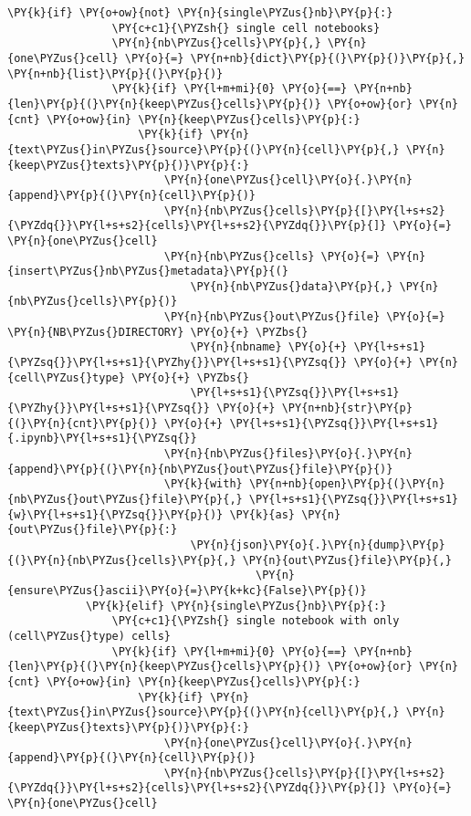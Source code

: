 \begin{tcolorbox}[breakable, size=fbox, boxrule=1pt, pad at break*=1mm,colback=cellbackground, colframe=cellborder]
\begin{Verbatim}[commandchars=\\\{\}]
            \PY{k}{if} \PY{o+ow}{not} \PY{n}{single\PYZus{}nb}\PY{p}{:}
                \PY{c+c1}{\PYZsh{} single cell notebooks}
                \PY{n}{nb\PYZus{}cells}\PY{p}{,} \PY{n}{one\PYZus{}cell} \PY{o}{=} \PY{n+nb}{dict}\PY{p}{(}\PY{p}{)}\PY{p}{,} \PY{n+nb}{list}\PY{p}{(}\PY{p}{)}
                \PY{k}{if} \PY{l+m+mi}{0} \PY{o}{==} \PY{n+nb}{len}\PY{p}{(}\PY{n}{keep\PYZus{}cells}\PY{p}{)} \PY{o+ow}{or} \PY{n}{cnt} \PY{o+ow}{in} \PY{n}{keep\PYZus{}cells}\PY{p}{:}
                    \PY{k}{if} \PY{n}{text\PYZus{}in\PYZus{}source}\PY{p}{(}\PY{n}{cell}\PY{p}{,} \PY{n}{keep\PYZus{}texts}\PY{p}{)}\PY{p}{:}
                        \PY{n}{one\PYZus{}cell}\PY{o}{.}\PY{n}{append}\PY{p}{(}\PY{n}{cell}\PY{p}{)}
                        \PY{n}{nb\PYZus{}cells}\PY{p}{[}\PY{l+s+s2}{\PYZdq{}}\PY{l+s+s2}{cells}\PY{l+s+s2}{\PYZdq{}}\PY{p}{]} \PY{o}{=} \PY{n}{one\PYZus{}cell}
                        \PY{n}{nb\PYZus{}cells} \PY{o}{=} \PY{n}{insert\PYZus{}nb\PYZus{}metadata}\PY{p}{(}
                            \PY{n}{nb\PYZus{}data}\PY{p}{,} \PY{n}{nb\PYZus{}cells}\PY{p}{)}
                        \PY{n}{nb\PYZus{}out\PYZus{}file} \PY{o}{=} \PY{n}{NB\PYZus{}DIRECTORY} \PY{o}{+} \PYZbs{}
                            \PY{n}{nbname} \PY{o}{+} \PY{l+s+s1}{\PYZsq{}}\PY{l+s+s1}{\PYZhy{}}\PY{l+s+s1}{\PYZsq{}} \PY{o}{+} \PY{n}{cell\PYZus{}type} \PY{o}{+} \PYZbs{}
                            \PY{l+s+s1}{\PYZsq{}}\PY{l+s+s1}{\PYZhy{}}\PY{l+s+s1}{\PYZsq{}} \PY{o}{+} \PY{n+nb}{str}\PY{p}{(}\PY{n}{cnt}\PY{p}{)} \PY{o}{+} \PY{l+s+s1}{\PYZsq{}}\PY{l+s+s1}{.ipynb}\PY{l+s+s1}{\PYZsq{}}
                        \PY{n}{nb\PYZus{}files}\PY{o}{.}\PY{n}{append}\PY{p}{(}\PY{n}{nb\PYZus{}out\PYZus{}file}\PY{p}{)}
                        \PY{k}{with} \PY{n+nb}{open}\PY{p}{(}\PY{n}{nb\PYZus{}out\PYZus{}file}\PY{p}{,} \PY{l+s+s1}{\PYZsq{}}\PY{l+s+s1}{w}\PY{l+s+s1}{\PYZsq{}}\PY{p}{)} \PY{k}{as} \PY{n}{out\PYZus{}file}\PY{p}{:}
                            \PY{n}{json}\PY{o}{.}\PY{n}{dump}\PY{p}{(}\PY{n}{nb\PYZus{}cells}\PY{p}{,} \PY{n}{out\PYZus{}file}\PY{p}{,}
                                      \PY{n}{ensure\PYZus{}ascii}\PY{o}{=}\PY{k+kc}{False}\PY{p}{)}
            \PY{k}{elif} \PY{n}{single\PYZus{}nb}\PY{p}{:}
                \PY{c+c1}{\PYZsh{} single notebook with only (cell\PYZus{}type) cells}
                \PY{k}{if} \PY{l+m+mi}{0} \PY{o}{==} \PY{n+nb}{len}\PY{p}{(}\PY{n}{keep\PYZus{}cells}\PY{p}{)} \PY{o+ow}{or} \PY{n}{cnt} \PY{o+ow}{in} \PY{n}{keep\PYZus{}cells}\PY{p}{:}
                    \PY{k}{if} \PY{n}{text\PYZus{}in\PYZus{}source}\PY{p}{(}\PY{n}{cell}\PY{p}{,} \PY{n}{keep\PYZus{}texts}\PY{p}{)}\PY{p}{:}
                        \PY{n}{one\PYZus{}cell}\PY{o}{.}\PY{n}{append}\PY{p}{(}\PY{n}{cell}\PY{p}{)}
                        \PY{n}{nb\PYZus{}cells}\PY{p}{[}\PY{l+s+s2}{\PYZdq{}}\PY{l+s+s2}{cells}\PY{l+s+s2}{\PYZdq{}}\PY{p}{]} \PY{o}{=} \PY{n}{one\PYZus{}cell}


\end{Verbatim}
\end{tcolorbox}

